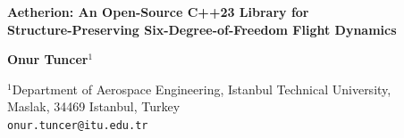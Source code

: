 \documentclass[a4paper,10pt]{article}
\theoremstyle{definition}
\begin{document}
\begin{center}
  {\Large\bfseries
    Aetherion: An Open-Source C++23 Library for\\[4pt]
    Structure-Preserving Six-Degree-of-Freedom Flight Dynamics}

  \vspace{10pt}

  {\normalsize\bfseries Onur Tuncer$^{1}$}

  \vspace{4pt}

  {\small
    $^{1}$Department of Aerospace Engineering, Istanbul Technical University,\\
    Maslak, 34469 Istanbul, Turkey\\
    \texttt{onur.tuncer@itu.edu.tr}}

  \vspace{10pt}
\end{center}
\end{document}
